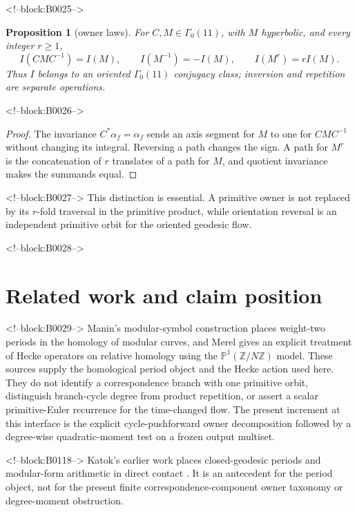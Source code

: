 \documentclass[11pt]{article}
\newtheorem{proposition}[theorem]{Proposition}
\theoremstyle{definition}
\theoremstyle{remark}
\newcommand{\G}{\Gamma_0(11)}
\begin{document}
<!--block:B0025-->
\begin{proposition}[owner laws]\label{prop:owner}
For $C,M\in\G$, with $M$ hyperbolic, and every integer $r\geq1$,
\[
I(CMC^{-1})=I(M),\qquad I(M^{-1})=-I(M),\qquad I(M^r)=rI(M).
\]
Thus $I$ belongs to an oriented $\G$ conjugacy class; inversion and repetition are separate operations.
\end{proposition}

<!--block:B0026-->
\begin{proof}
The invariance $C^*\alpha_f=\alpha_f$ sends an axis segment for $M$ to one for $CMC^{-1}$ without changing its integral. Reversing a path changes the sign. A path for $M^r$ is the concatenation of $r$ translates of a path for $M$, and quotient invariance makes the summands equal.
\end{proof}

<!--block:B0027-->
This distinction is essential. A primitive owner is not replaced by its $r$-fold traversal in the primitive product, while orientation reversal is an independent primitive orbit for the oriented geodesic flow.

<!--block:B0028-->
\section{Related work and claim position}

<!--block:B0029-->
Manin's modular-symbol construction places weight-two periods in the homology of modular curves, and Merel gives an explicit treatment of Hecke operators on relative homology using the $\mathbb P^1(\mathbb Z/N\mathbb Z)$ model.
\citep[Introduction and Sections~1--2]{merel1991}
These sources supply the homological period object and the Hecke action used here. They do not identify a correspondence branch with one primitive orbit, distinguish branch-cycle degree from product repetition, or assert a scalar primitive-Euler recurrence for the time-changed flow. The present increment at this interface is the explicit cycle-pushforward owner decomposition followed by a degree-wise quadratic-moment test on a frozen output multiset.

<!--block:B0118-->
Katok's earlier work places closed-geodesic periods and modular-form arithmetic in direct contact \citep{Katok1985}. It is an antecedent for the period object, not for the present finite correspondence-component owner taxonomy or degree-moment obstruction.
\end{document}
